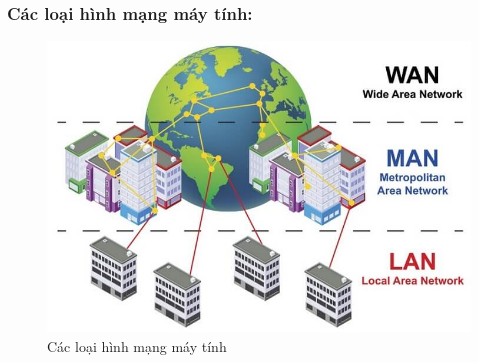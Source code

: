 \documentclass[13pt]{article}
\begin{document}
\subsubsection{Các loại hình mạng máy tính:}
\begin{figure}[h!]
        \centering
        \includegraphics[width=0.7\linewidth]{image/image5.png}
            \caption{Các loại hình mạng máy tính}
            \label{fig:label1}
    \end{figure}
\end{document}
